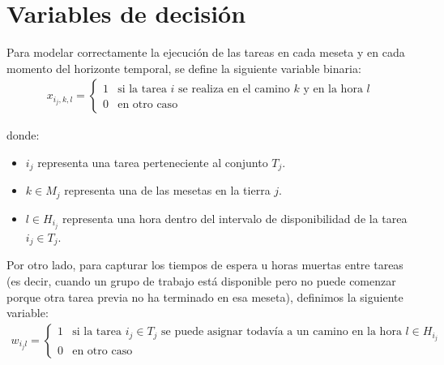 \section*{Variables de decisión}
Para modelar correctamente la ejecución de las tareas en cada meseta y en cada momento del horizonte temporal, se define la siguiente variable binaria:
\[\begin{aligned}
    x_{i_j,k,l} = \begin{cases} 1 & \text{si la tarea } i \text{ se realiza en el camino } k \text{ y en la hora } l \\ 0 & \text{en otro caso} \end{cases}
\end{aligned}\]

donde:
\begin{itemize}
    \item $i_j$ representa una tarea perteneciente al conjunto $T_j$.
    \item $k \in M_j$ representa una de las mesetas en la tierra $j$.
    \item $l \in H_{i_j}$ representa una hora dentro del intervalo de disponibilidad de la tarea $i_j \in T_j$.
\end{itemize}

Por otro lado, para capturar los tiempos de espera u horas muertas entre tareas
(es decir, cuando un grupo de trabajo está disponible pero no puede comenzar porque otra tarea previa no ha terminado en esa meseta), definimos la siguiente variable:
\[\begin{aligned}
    w_{i_j l} = \begin{cases} 1 & \text{si la tarea } i_j \in T_j \text{ se puede asignar todavía a un camino en la hora } l \in H_{i_j} \\ 0 & \text{en otro caso} \end{cases}
\end{aligned}\] 


